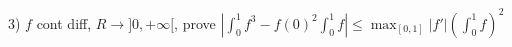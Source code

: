 3) $f$ cont diff, $R\rightarrow ]0,+\infty[$, prove $|\int_{0}^{1}f^{3}-{f(0)}^{2}\int_{0}^{1}f| \leq \max_{[0,1]} |f'|(\int_{0}^{1}f)^{2}$